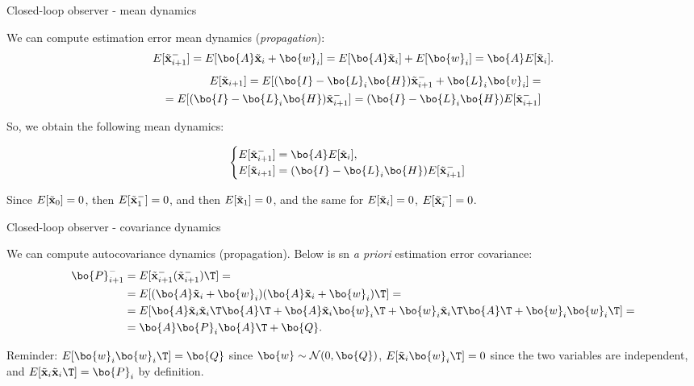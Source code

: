 \documentclass{beamer}
\newcommand{\btil}[1] {\Tilde{\mathbf{#1}}}
\begin{document}
\begin{frame}{Closed-loop observer - mean dynamics}
	\begin{flushleft}
		
		We can compute estimation error mean dynamics (\emph{propagation}):
				\begin{align*}
		E[\btil{x}_{i+1}^-] = 
		E[\bo{A} \btil{x}_i + \bo{w}_i] = 
		E[\bo{A} \btil{x}_i] + E[\bo{w}_i]  =
		\bo{A}E[\btil{x}_i].
				\end{align*}	
				\begin{align*}
		E[\btil{x}_{i+1}] = 
		E[(\bo{I} - \bo{L}_i \bo{H}) \btil{x}_{i+1}^- + \bo{L}_i\bo{v}_i] =\\
		=E[(\bo{I} - \bo{L}_i \bo{H}) \btil{x}_{i+1}^-]
		= 
		(\bo{I} - \bo{L}_i \bo{H}) E[\btil{x}_{i+1}^-]
				\end{align*}				
		
		So, we obtain the following mean dynamics:
		
				\begin{equation}
						\begin{cases}
								E[\btil{x}_{i+1}^-] = \bo{A} E[\btil{x}_i], \\
								E[\btil{x}_{i+1}] = (\bo{I} - \bo{L}_i \bo{H}) E[\btil{x}_{i+1}^-]
							\end{cases}
					\end{equation}		
		
		Since $E[\btil{x}_0] = 0$, then $E[\btil{x}_1^-] = 0$, and then $E[\btil{x}_1] = 0$, and the same for $E[\btil{x}_i] = 0$, $E[\btil{x}_i^-] = 0$.
		
	\end{flushleft}
\end{frame}



\begin{frame}{Closed-loop observer - covariance dynamics}
	\begin{flushleft}
		
		We can compute autocovariance dynamics (propagation). Below is sn \emph{a priori} estimation error covariance:
		\begin{align*}
				\bo{P}_{i+1}^- 
				&= E[\btil{x}_{i+1}^- (\btil{x}_{i+1}^-)\T] = \\
				&= E[ (\bo{A} \btil{x}_i + \bo{w}_i) (\bo{A} \btil{x}_i + \bo{w}_i)\T] = 
				\\
				&= E[ \bo{A} \btil{x}_i \btil{x}_i\T   \bo{A}\T
				+ 
				\bo{A} \btil{x}_i \bo{w}_i\T 
				+
				\bo{w}_i\btil{x}_i \T\bo{A}\T
				+
				\bo{w}_i\bo{w}_i\T ]=\\
				&= \bo{A} \bo{P}_i \bo{A}\T +\bo{Q}.
		\end{align*}		
	
		\bigskip
	
		\textcolor{mydarkgray}{Reminder: $E[\bo{w}_i \bo{w}_i\T] = \bo{Q}$ since $\bo{w} \sim \mathcal{N} (0, \bo{Q})$, $E[\btil{x}_i \bo{w}_i\T] = 0$ since the two variables are independent, and $E[\btil{x}_i \btil{x}_i\T] = \bo{P}_i$ by definition.}
		
		
	\end{flushleft}
\end{frame}
\end{document}
